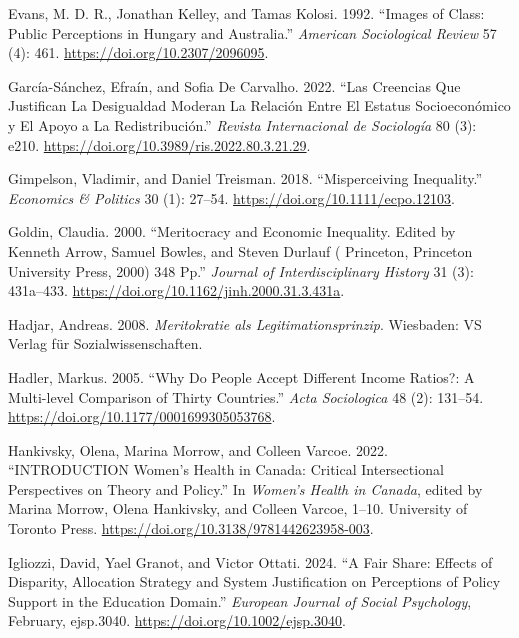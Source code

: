 \documentclass[
]{article}
\newlength{\cslhangindent}
\newenvironment{CSLReferences}[2] %
 {\begin{list}{}{%
  \setlength{\itemindent}{0pt}
  \setlength{\leftmargin}{0pt}
  \setlength{\parsep}{0pt}
  \ifodd #1
   \setlength{\leftmargin}{\cslhangindent}
   \setlength{\itemindent}{-1\cslhangindent}
  \fi
  \setlength{\itemsep}{#2\baselineskip}}}
 {\end{list}}
\begin{document}
\begin{CSLReferences}{1}{0}
Evans, M. D. R., Jonathan Kelley, and Tamas Kolosi. 1992. {``Images of
{Class}: {Public Perceptions} in {Hungary} and {Australia}.''}
\emph{American Sociological Review} 57 (4): 461.
\url{https://doi.org/10.2307/2096095}.

García-Sánchez, Efraín, and Sofia De Carvalho. 2022. {``Las Creencias
Que Justifican La Desigualdad Moderan La Relaci{ó}n Entre El Estatus
Socioecon{ó}mico y El Apoyo a La Redistribuci{ó}n.''} \emph{Revista
Internacional de Sociolog{í}a} 80 (3): e210.
\url{https://doi.org/10.3989/ris.2022.80.3.21.29}.

Gimpelson, Vladimir, and Daniel Treisman. 2018. {``Misperceiving
Inequality.''} \emph{Economics \& Politics} 30 (1): 27--54.
\url{https://doi.org/10.1111/ecpo.12103}.

Goldin, Claudia. 2000. {``Meritocracy and {Economic Inequality}.
{Edited} by {Kenneth Arrow}, {Samuel Bowles}, and {Steven Durlauf} (
{Princeton}, {Princeton University Press}, 2000) 348 Pp.''}
\emph{Journal of Interdisciplinary History} 31 (3): 431a--433.
\url{https://doi.org/10.1162/jinh.2000.31.3.431a}.

Hadjar, Andreas. 2008. \emph{{Meritokratie als Legitimationsprinzip}}.
Wiesbaden: VS Verlag f{ü}r Sozialwissenschaften.

Hadler, Markus. 2005. {``Why {Do People Accept Different Income
Ratios}?: {A Multi-level Comparison} of {Thirty Countries}.''}
\emph{Acta Sociologica} 48 (2): 131--54.
\url{https://doi.org/10.1177/0001699305053768}.

Hankivsky, Olena, Marina Morrow, and Colleen Varcoe. 2022.
{``{INTRODUCTION Women}'s {Health} in {Canada}: {Critical Intersectional
Perspectives} on {Theory} and {Policy}.''} In \emph{Women's {Health} in
{Canada}}, edited by Marina Morrow, Olena Hankivsky, and Colleen Varcoe,
1--10. University of Toronto Press.
\url{https://doi.org/10.3138/9781442623958-003}.

Igliozzi, David, Yael Granot, and Victor Ottati. 2024. {``A Fair Share:
{Effects} of Disparity, Allocation Strategy and System Justification on
Perceptions of Policy Support in the Education Domain.''} \emph{European
Journal of Social Psychology}, February, ejsp.3040.
\url{https://doi.org/10.1002/ejsp.3040}.


\end{CSLReferences}
\end{document}
